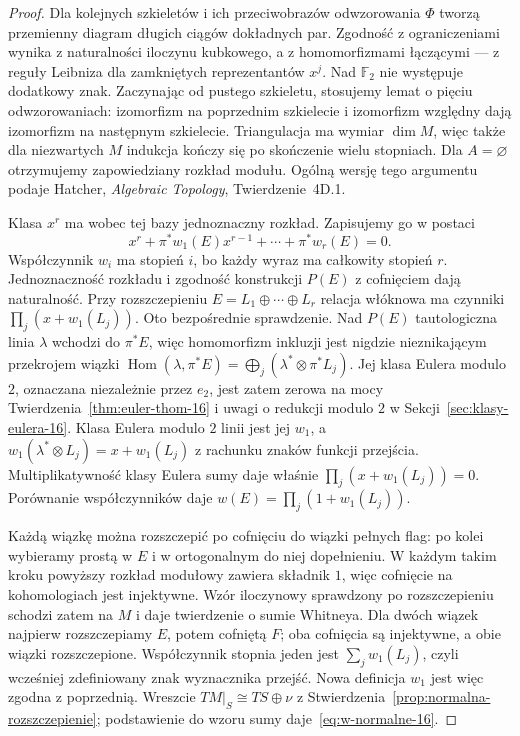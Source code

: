 \begin{proof}
Dla kolejnych szkieletów i ich przeciwobrazów odwzorowania $\Phi$
tworzą przemienny diagram długich ciągów dokładnych par.
Zgodność z ograniczeniami wynika z naturalności iloczynu kubkowego,
a z homomorfizmami łączącymi --- z reguły Leibniza dla zamkniętych
reprezentantów $x^j$. Nad $\mathbb F_2$ nie występuje dodatkowy znak.
Zaczynając od pustego szkieletu, stosujemy lemat o pięciu
odwzorowaniach: izomorfizm na poprzednim szkielecie i izomorfizm
względny dają izomorfizm na następnym szkielecie.
Triangulacja ma wymiar $\dim M$, więc także dla niezwartych $M$
indukcja kończy się po skończenie wielu stopniach. Dla $A=\varnothing$
otrzymujemy zapowiedziany rozkład modułu. Ogólną wersję tego argumentu
podaje Hatcher, \emph{Algebraic Topology}, Twierdzenie~4D.1.

Klasa $x^r$ ma wobec
tej bazy jednoznaczny
rozkład. Zapisujemy
go w postaci
\[
 x^r+
   \pi^*w_1(E)x^{r-1}
     +\cdots+\pi^*w_r(E)=0.
\]
Współczynnik $w_i$
ma stopień $i$,
bo każdy wyraz ma
całkowity stopień $r$.
Jednoznaczność rozkładu
i zgodność konstrukcji
$P(E)$ z cofnięciem
dają naturalność.
Przy rozszczepieniu
$E=L_1\oplus\cdots\oplus L_r$
relacja włóknowa
ma czynniki
$\prod_j(x+w_1(L_j))$.
Oto bezpośrednie
sprawdzenie. Nad $P(E)$
tautologiczna linia
$\lambda$ wchodzi
do $\pi^*E$, więc
homomorfizm inkluzji
jest nigdzie
nieznikającym
przekrojem wiązki
$\operatorname{Hom}(\lambda,\pi^*E)
=\bigoplus_j(\lambda^*\otimes\pi^*L_j)$.
Jej klasa Eulera modulo $2$, oznaczana niezależnie
przez $e_2$, jest zatem zerowa
na mocy
Twierdzenia~\ref{thm:euler-thom-16}
i uwagi o redukcji
modulo $2$ w
Sekcji~\ref{sec:klasy-eulera-16}.
Klasa Eulera modulo $2$
linii jest jej
$w_1$, a
$w_1(\lambda^*\otimes L_j)
=x+w_1(L_j)$
z rachunku znaków
funkcji przejścia.
Multiplikatywność
klasy Eulera sumy
daje właśnie
$\prod_j(x+w_1(L_j))=0$.
Porównanie współczynników
daje
$w(E)=\prod_j(1+w_1(L_j))$.

Każdą wiązkę można
rozszczepić po cofnięciu
do wiązki pełnych flag:
po kolei wybieramy
prostą w $E$ i w
ortogonalnym do niej
dopełnieniu. W każdym
takim kroku powyższy
rozkład modułowy
zawiera składnik $1$,
więc cofnięcie
na kohomologiach
jest injektywne.
Wzór iloczynowy
sprawdzony po
rozszczepieniu
schodzi zatem na $M$
i daje twierdzenie o sumie Whitneya. Dla dwóch
wiązek najpierw rozszczepiamy $E$, potem cofniętą $F$;
oba cofnięcia są injektywne, a obie wiązki rozszczepione.
Współczynnik stopnia jeden jest $\sum_jw_1(L_j)$,
czyli wcześniej zdefiniowany znak wyznacznika przejść.
Nowa definicja $w_1$ jest więc zgodna z poprzednią.
Wreszcie
$TM|_S\cong TS\oplus\nu$
z
Stwierdzenia~\ref{prop:normalna-rozszczepienie};
podstawienie do wzoru
sumy daje~\eqref{eq:w-normalne-16}.
\end{proof}

